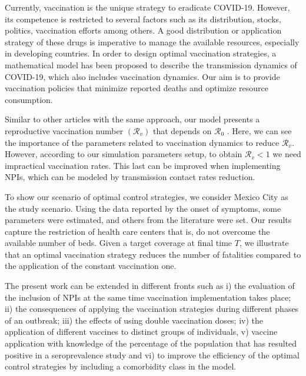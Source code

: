\noindent Currently, vaccination is the unique strategy to eradicate COVID-19. However, its competence is restricted to several factors such as its distribution, stocks, politics, vaccination efforts among others.
 A good distribution or application strategy of these drugs is imperative to manage the available resources, especially in developing countries. In order to design optimal vaccination strategies, a mathematical model has been proposed to describe the transmission dynamics of COVID-19, which also includes vaccination dynamics. Our aim is to provide vaccination policies that minimize reported deaths and optimize resource consumption.
 
Similar to other articles with the same approach, our model presents a reproductive vaccination number $(\mathcal{R}_{v})$ that depends on $\mathcal{R}_{0}$ \cite{Alexander2004}. Here, we can see the importance of the parameters related to vaccination dynamics to reduce $\mathcal{R}_{v}$. However, according to our simulation parameters setup, to obtain $\mathcal{R}_{v} < 1$ we need impractical vaccination rates. This last can be improved when implementing NPIs, which can be modeled by transmission contact rates reduction.

To show our scenario of optimal control strategies, we consider Mexico City as the study scenario. Using the data reported by the onset of symptoms, some parameters were estimated, and others from the literature were set. Our results capture the restriction of health care centers that is, do not overcome the available number of beds. Given a target coverage at final time $T$, we illustrate that an optimal vaccination strategy reduces the number of fatalities compared to the application of the constant vaccination one. 

The present work can be extended in different fronts such as i) the evaluation of the inclusion of NPIs at the same time vaccination implementation takes place; ii) the consequences of applying the vaccination strategies during different phases of an outbreak; iii) the effects of using double vaccination doses; iv) the application of different vaccines to distinct groups of individuals, v) vaccine application with knowledge of the percentage of the population that has resulted positive in a seroprevalence study and vi) to improve the efficiency of the optimal control strategies by including a comorbidity class in the model.